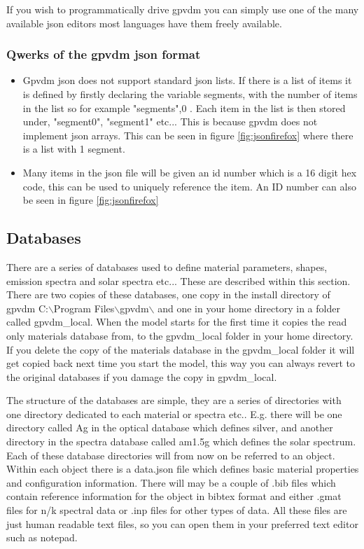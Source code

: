 If you wish to programmatically drive gpvdm you can simply use one of the many available json editors most languages have them freely available. 

\subsubsection{Qwerks of the gpvdm json format}
\begin{itemize}
  \item Gpvdm json does not support standard json lists.  If there is a list of items it is defined by firstly declaring the variable segments, with the number of items in the list so for example "segments",0 . Each item in the list is then stored under, "segment0", "segment1" etc... This is because gpvdm does not implement json arrays.  This can be seen in figure \ref{fig:jsonfirefox} where there is a list with 1 segment.
  \item Many items in the json file will be given an id number which is a 16 digit hex code, this can be used to uniquely reference the item. An ID number can also be seen in figure \ref{fig:jsonfirefox}
\end{itemize}



\subsection{Databases}
There are a series of databases used to define material parameters, shapes, emission spectra and solar spectra etc...  These are described within this section.  There are two copies of these databases, one copy in the install directory of gpvdm  C:$\backslash$Program Files$\backslash$gpvdm$\backslash$ and one in your home directory in a folder called gpvdm\_local.   When the model starts for the first time it copies the read only materials database from, to the gpvdm\_local folder in your home directory.  If you delete the copy of the materials database in the gpvdm\_local folder it will get copied back next time you start the model, this way you can always revert to the original databases if you damage the copy in gpvdm\_local.

The structure of the databases are simple, they are a series of directories with one directory dedicated to each material or spectra etc.. E.g. there will be one directory called Ag in the optical database which defines silver, and another directory in the spectra database called am1.5g which defines the solar spectrum.  Each of these database directories will from now on be referred to an object.  Within each object there is a data.json file which defines basic material properties and configuration information.  There will may be a couple of .bib files which contain reference information for the object in bibtex format and either .gmat files for n/k spectral data or .inp files for other types of data.  All these files are just human readable text files, so you can open them in your preferred text editor such as notepad.

